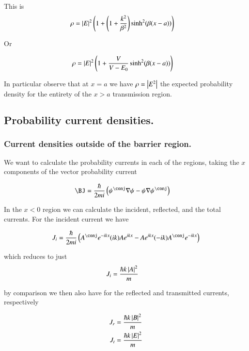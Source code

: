 \documentclass{article}
\begin{document}
This is
\begin{align}\label{eqn:pDensityInBarrier}
\rho
&= \left\lvert{E}\right\rvert^2 
\left( 1 + \left(1 + \frac{k^2}{\beta^2}\right) \sinh^2( \beta(x-a)) \right) 
\end{align}

Or

\begin{align}
\rho
&= \left\lvert{E}\right\rvert^2 
\left( 1 + \frac{V}{V-E_0} \sinh^2( \beta(x-a)) \right) 
\end{align}

In particular observe that at $x=a$ we have $\rho = \left\lvert{E^2}\right\rvert$ the expected probability density for the entirety 
of the $x>a$ transmission region.

\subsection{ Probability current densities. }


\subsubsection{ Current densities outside of the barrier region. }

We want to calculate the probability currents in each of the regions, taking the $x$ components of the vector 
probability current

\begin{align}
\BJ
&=
\frac{\hbar}{2 m i}
\left(
\psi^\conj \grad \psi
-\psi \grad \psi^\conj
\right)
\end{align}

In the $x<0$ region we can calculate the incident, reflected, and the total currents.  For the incident current we have

\begin{align*}
J_i
&= \frac{\hbar}{2mi}\left( A^\conj e^{-i k x} (ik)A e^{i k x} -Ae^{i k x} (-ik)A^\conj e^{-i k x} \right) \\
\end{align*}

which reduces to just
\begin{align}
J_i &= \frac{\hbar k \left\lvert{A}\right\rvert^2 }{m}
\end{align}

by comparison we then also have for the reflected and transmitted currents, respectively

\begin{align}
J_r &= \frac{\hbar k \left\lvert{B}\right\rvert^2 }{m} \\
J_t &= \frac{\hbar k \left\lvert{E}\right\rvert^2 }{m}
\end{align}
\end{document}
